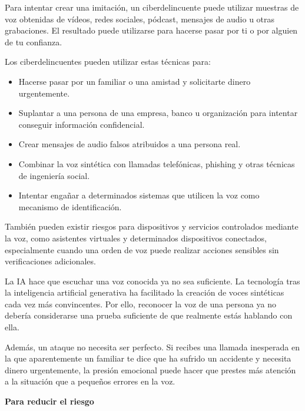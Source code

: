 \documentclass[
  spanish,
  a4paper,
  openany]{book}
\begin{document}
Para intentar crear una imitación, un ciberdelincuente puede utilizar muestras de voz obtenidas de vídeos, redes sociales, pódcast, mensajes de audio u otras grabaciones. El resultado puede utilizarse para hacerse pasar por ti o por alguien de tu confianza.

Los ciberdelincuentes pueden utilizar estas técnicas para:

\begin{itemize}
\item
  Hacerse pasar por un familiar o una amistad y solicitarte dinero urgentemente.
\item
  Suplantar a una persona de una empresa, banco u organización para intentar conseguir información confidencial.
\item
  Crear mensajes de audio falsos atribuidos a una persona real.
\item
  Combinar la voz sintética con llamadas telefónicas, phishing y otras técnicas de ingeniería social.
\item
  Intentar engañar a determinados sistemas que utilicen la voz como mecanismo de identificación.
\end{itemize}

También pueden existir riesgos para dispositivos y servicios controlados mediante la voz, como asistentes virtuales y determinados dispositivos conectados, especialmente cuando una orden de voz puede realizar acciones sensibles sin verificaciones adicionales.

La IA hace que escuchar una voz conocida ya no sea suficiente. La tecnología tras la inteligencia artificial generativa ha facilitado la creación de voces sintéticas cada vez más convincentes. Por ello, reconocer la voz de una persona ya no debería considerarse una prueba suficiente de que realmente estás hablando con ella.

Además, un ataque no necesita ser perfecto. Si recibes una llamada inesperada en la que aparentemente un familiar te dice que ha sufrido un accidente y necesita dinero urgentemente, la presión emocional puede hacer que prestes más atención a la situación que a pequeños errores en la voz.

\textbf{Para reducir el riesgo}
\end{document}
